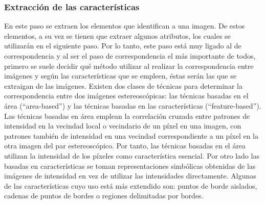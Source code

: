 \subsubsection{Extracción de las características}
En este paso se extraen los elementos que identifican a una imagen. De estos elementos, a su vez se tienen que extraer algunos atributos, los cuales se utilizarán en el siguiente paso. Por lo tanto, este paso está muy ligado al de correspondencia y al ser el paso de correspondencia el más importante de todos, primero se suele decidir qué método utilizar al realizar la correspondencia entre imágenes y según las características que se empleen, éstas serán las que se extraigan de las imágenes. Existen dos clases de técnicas para determinar la correspondencia entre dos imágenes estereoscópicas: las técnicas basadas en el área (“area-based”) y las técnicas basadas en las características (“feature-based”).
\\
Las técnicas basadas en área emplean la correlación cruzada entre patrones de intensidad en la vecindad local o vecindario de un píxel en una imagen, con patrones también de intensidad en una vecindad correspondiente a un píxel en la otra imagen del par estereoscópico. Por tanto, las técnicas basadas en el área utilizan la intensidad de los píxeles como característica esencial. Por otro lado las basadas en características se toman representaciones simbólicas obtenidas de las imágenes de intensidad en vez de utilizar las intensidades directamente. Algunas de las características cuyo uso está más extendido son: puntos de borde aislados, cadenas de puntos de bordes o regiones delimitadas por bordes.
